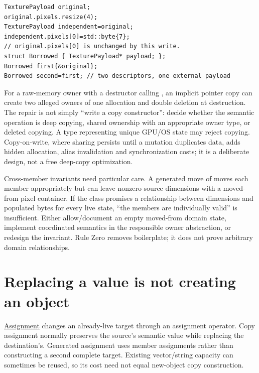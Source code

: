 \begin{verbatim}
TexturePayload original;
original.pixels.resize(4);
TexturePayload independent=original;
independent.pixels[0]=std::byte{7};
// original.pixels[0] is unchanged by this write.
struct Borrowed { TexturePayload* payload; };
Borrowed first{&original};
Borrowed second=first; // two descriptors, one external payload
\end{verbatim}

For a raw-memory owner with a destructor calling , an implicit pointer copy can create two alleged owners of one allocation and double deletion at destruction. The repair is not simply ``write a copy constructor'': decide whether the semantic operation is deep copying, shared ownership with an appropriate owner type, or deleted copying. A type representing unique GPU/OS state may reject copying. Copy-on-write, where sharing persists until a mutation duplicates data, adds hidden allocation, alias invalidation and synchronization costs; it is a deliberate design, not a free deep-copy optimization.

Cross-member invariants need particular care. A generated move of  moves each member appropriately but can leave nonzero source dimensions with a moved-from pixel container. If the class promises a relationship between dimensions and populated bytes for every live state, ``the members are individually valid'' is insufficient. Either allow/document an empty moved-from domain state, implement coordinated semantics in the responsible owner abstraction, or redesign the invariant. Rule Zero removes boilerplate; it does not prove arbitrary domain relationships.

\section{Replacing a value is not creating an object}\label{01-foundations-i-ch003-replacing-a-value-is-not-creating-an-object}

\hypertarget{01-foundations-i-ch003-replacing-a-value-is-not-creating-an-object}{}

\hyperref[appendix-bea6beb5350f]{Assignment} changes an already-live target through an assignment operator. Copy assignment normally preserves the source's semantic value while replacing the destination's. Generated assignment uses member assignments rather than constructing a second complete target. Existing vector/string capacity can sometimes be reused, so its cost need not equal new-object copy construction.


